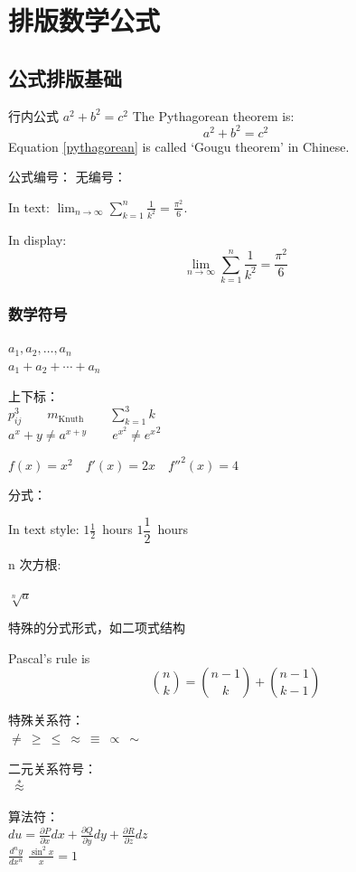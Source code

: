 \documentclass[10pt,a4paper,twocolumn]{book}
\begin{document}
\chapter{排版数学公式}
\section{公式排版基础}
行内公式 $a^2 + b^2 = c^2$
The Pythagorean theorem is: 
\begin{equation}
a^2 + b^2 = c^2 \label{pythagorean} 
\end{equation}
Equation \eqref{pythagorean} is called `Gougu theorem' in Chinese.

公式编号：
无编号：%

In text: 
$\lim_{n \to \infty}
 \sum_{k=1}^n \frac{1}{k^2}
  = \frac{\pi^2}{6}$.  %

In display: 
\[
\lim_{n \to \infty}
 \sum_{k=1}^n \frac{1}{k^2}
  = \frac{\pi^2}{6}     %
\]

\subsection{数学符号}
$a_1, a_2, \dots, a_n$ \\
$a_1 + a_2 + \cdots + a_n$

上下标：\\
$p^3_{ij} \qquad 
m_\mathrm{Knuth}\qquad 
\sum_{k=1}^3 k $\\[5pt]
$a^x+y \neq a^{x+y}\qquad
 e^{x^2} \neq {e^x}^2$

$f(x)=x^2 \quad f'(x)=2x \quad f''^2(x)=4$

分式：

In text style: $1\frac{1}{2}$~hours \qquad $1\dfrac{1}{2}$~hours

n 次方根:

$\sqrt[n]{a}$

特殊的分式形式，如二项式结构

Pascal's rule is \[
\binom{n}{k} =\binom{n-1}{k} + \binom{n-1}{k-1}
\]

特殊关系符：\\
$\ne~\ge~\le~\approx~\equiv~\propto~\sim$

二元关系符号：\\
$~\stackrel{*}{\approx}$

算法符：\\
$du = \frac{\partial P}{\partial x}dx+\frac{\partial Q}{\partial y}dy
+\frac{\partial R}{\partial z}dz$\\
$\frac{d^n y}{d x^n} $
$\frac{\sin^2 x}{x}=1$
\end{document}
